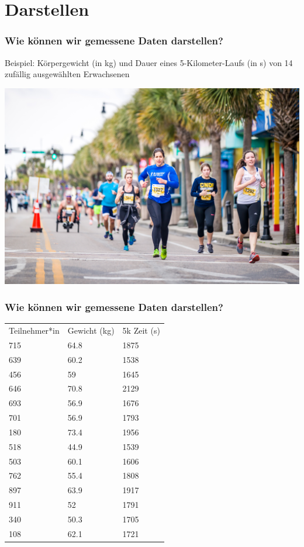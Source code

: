 \documentclass{beamer}
\begin{document}
\section{Darstellen}

\begin{frame}
\frametitle{Wie können wir gemessene Daten darstellen?}

Beispiel: Körpergewicht (in kg) und Dauer eines 5-Kilometer-Laufs (in s) von 14 zufällig ausgewählten Erwachsenen
 
\begin{center}
\includegraphics[width=\textwidth]{runners.jpg}
\end{center}

\end{frame}

\begin{frame}

\frametitle{Wie können wir gemessene Daten darstellen?}


\begin{tabular}{lll}
Teilnehmer*in   & Gewicht (kg)  &  5k Zeit (s)  \\
715 &	64.8 &	1875  \\
639 &	60.2 &	1538 \\
456 &	59 &	1645 \\
646 &	70.8 &	2129 \\
693 &	56.9 &	1676 \\
701 &	56.9 &	1793 \\
180 &	73.4 &	1956 \\
518 &	44.9 &	1539 \\
503 &	60.1 &	1606 \\
762 &	55.4 &	1808 \\
897 &	63.9 &	1917 \\
911 &	52 &	1791 \\
340 &	50.3 &	1705 \\
108 &	62.1 &	1721 \\
\end{tabular}



\end{frame}
\end{document}
